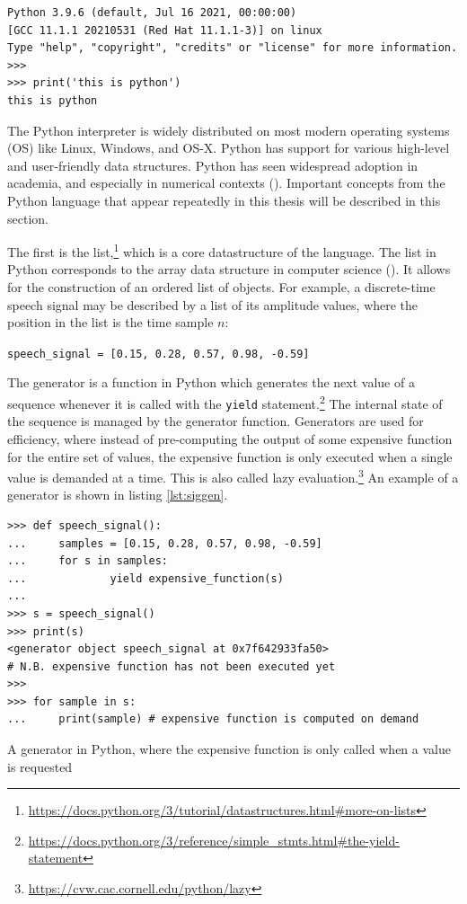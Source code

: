 \documentclass[report.tex]{subfiles}
\begin{document}
\begin{listing}[!ht]
\centering
\begin{BVerbatim}
Python 3.9.6 (default, Jul 16 2021, 00:00:00)
[GCC 11.1.1 20210531 (Red Hat 11.1.1-3)] on linux
Type "help", "copyright", "credits" or "license" for more information.
>>>
>>> print('this is python')
this is python
\end{BVerbatim}
\end{listing}

The Python interpreter is widely distributed on most modern operating systems (OS) like Linux, Windows, and OS-X. Python has support for various high-level and user-friendly data structures. Python has seen widespread adoption in academia, and especially in numerical contexts (\cite{pythonscience}). Important concepts from the Python language that appear repeatedly in this thesis will be described in this section.

The first is the list,\footnote{\url{https://docs.python.org/3/tutorial/datastructures.html\#more-on-lists}} which is a core datastructure of the language. The list in Python corresponds to the array data structure in computer science (\cite{skiena}). It allows for the construction of an ordered list of objects. For example, a discrete-time speech signal may be described by a list of its amplitude values, where the position in the list is the time sample $n$:

\hfil \Verb#speech_signal = [0.15, 0.28, 0.57, 0.98, -0.59]#

The generator is a function in Python which generates the next value of a sequence whenever it is called with the \Verb#yield# statement.\footnote{\url{https://docs.python.org/3/reference/simple_stmts.html\#the-yield-statement}} The internal state of the sequence is managed by the generator function. Generators are used for efficiency, where instead of pre-computing the output of some expensive function for the entire set of values, the expensive function is only executed when a single value is demanded at a time. This is also called lazy evaluation.\footnote{\url{https://cvw.cac.cornell.edu/python/lazy}} An example of a generator is shown in listing \ref{lst:siggen}.

\begin{listing}[ht]
\centering
\begin{BVerbatim}
>>> def speech_signal():
...     samples = [0.15, 0.28, 0.57, 0.98, -0.59]
...     for s in samples:
...             yield expensive_function(s)
...
>>> s = speech_signal()
>>> print(s)
<generator object speech_signal at 0x7f642933fa50>
# N.B. expensive function has not been executed yet
>>>
>>> for sample in s:
...     print(sample) # expensive function is computed on demand
\end{BVerbatim}
	\caption{A generator in Python, where the expensive function is only called when a value is requested}
	\label{lst:siggen}
\end{listing}
\end{document}

